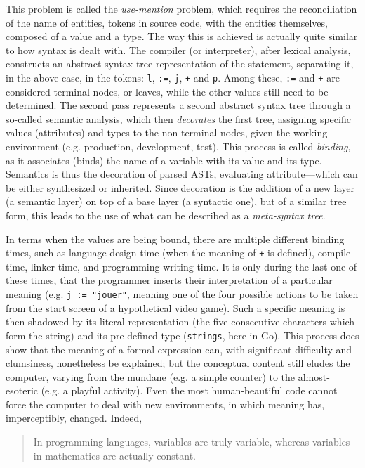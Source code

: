 \documentclass{article}
\begin{document}
This problem is called the \emph{use-mention} problem, which requires the reconciliation of the name of entities, tokens in source code, with the entities themselves, composed of a value and a type. The way this is achieved is actually quite similar to how syntax is dealt with. The compiler (or interpreter), after lexical analysis, constructs an abstract syntax tree representation of the statement, separating it, in the above case, in the tokens: \lstinline{l}, \lstinline{:=}, \lstinline{j}, \lstinline{+} and \lstinline{p}. Among these, \lstinline{:=} and \lstinline{+} are considered terminal nodes, or leaves, while the other values still need to be determined. The second pass represents a second abstract syntax tree through a so-called semantic analysis, which then \emph{decorates} the first tree, assigning specific values (attributes) and types to the non-terminal nodes, given the working environment (e.g. production, development, test). This process is called \emph{binding}, as it associates (binds) the name of a variable with its value and its type. Semantics is thus the decoration of parsed ASTs, evaluating attribute—which can be either synthesized or inherited. Since decoration is the addition of a new layer (a semantic layer) on top of a base layer (a syntactic one), but of a similar tree form, this leads to the use of what can be described as a \emph{meta-syntax tree}.

In terms when the values are being bound, there are multiple different binding times, such as language design time (when the meaning of \lstinline{+} is defined), compile time, linker time, and programming writing time. It is only during the last one of these times, that the programmer inserts their interpretation of a particular meaning (e.g. \lstinline{j := "jouer"}, meaning one of the four possible actions to be taken from the start screen of a hypothetical video game). Such a specific meaning is then shadowed by its literal representation (the five consecutive characters which form the string) and its pre-defined type (\lstinline{strings}, here in Go). This process does show that the meaning of a formal expression can, with significant difficulty and clumsiness, nonetheless be explained; but the conceptual content still eludes the computer, varying from the mundane (e.g. a simple counter) to the almost-esoteric (e.g. a playful activity). Even the most human-beautiful code cannot force the computer to deal with new environments, in which meaning has, imperceptibly, changed. Indeed,

\begin{quote}
  In programming languages, variables are truly variable, whereas variables in mathematics are actually constant\cite{wirth_essence_2003}.
\end{quote}
\end{document}
